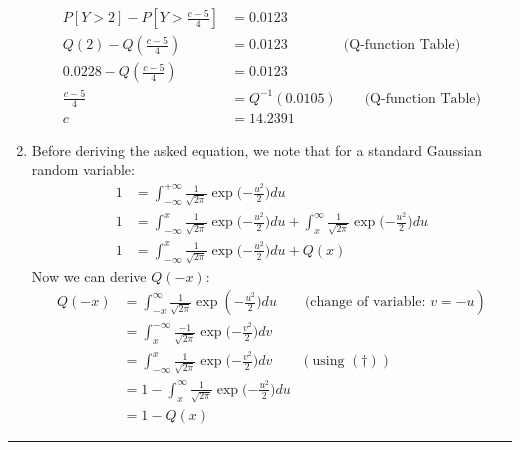 \documentclass[12pt, letterpaper]{scrartcl}
\begin{document}
\begin{enumerate}[((a))]
\begin{align*}
        P[Y>2]-P[Y>\frac{c-5}{4}]&=0.0123\\
        Q(2)-Q(\frac{c-5}{4})&=0.0123 \qquad\qquad \text{(Q-function Table)}\\ 
        0.0228-Q(\frac{c-5}{4})&=0.0123\\
        \frac{c-5}{4}&=Q^{-1}(0.0105)\qquad \text{(Q-function Table)}\\
        c&=14.2391
    \end{align*}
    \item Before deriving the asked equation, we note that for a standard Gaussian random variable:
    \begin{align*}
        1&=\int_{-\infty}^{+\infty}\frac{1}{\sqrt{2\pi}}\exp({-\frac{u^2}{2})du}\\
        1&=\int_{-\infty}^x\frac{1}{\sqrt{2\pi}}\exp({-\frac{u^2}{2})du} + \int_x^\infty\frac{1}{\sqrt{2\pi}}\exp({-\frac{u^2}{2})du}\tag{$\dagger$}\\ 
        1&=\int_{-\infty}^x\frac{1}{\sqrt{2\pi}}\exp({-\frac{u^2}{2})du} + Q(x)
    \end{align*}
    Now we can derive $Q(-x)$:
    \begin{align*}
        Q(-x)&=\int_{-x}^\infty\frac{1}{\sqrt{2\pi}}\exp({-\frac{u^2}{2})du} \qquad \text{(change of variable: } v=-u)\\
        &=\int_{x}^{-\infty}\frac{-1}{\sqrt{2\pi}}\exp({-\frac{v^2}{2})dv}\\
        &=\int_{-\infty}^{x}\frac{1}{\sqrt{2\pi}}\exp({-\frac{v^2}{2})dv}\qquad (\text{using }(\dagger))\\
        &=1-\int_x^\infty\frac{1}{\sqrt{2\pi}}\exp({-\frac{u^2}{2})du}\\
        &=1-Q(x)
    \end{align*}
\end{enumerate}
\hrule
\clearpage
\end{document}
